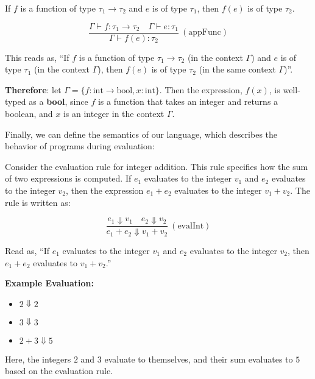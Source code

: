 \vspace{-1em}
\begin{Example}

    \label{ex:function_application}
    
    If $f$ is a function of type $\tau_1 \rightarrow \tau_2$ and $e$ is of type $\tau_1$, then $f(e)$ is of type $\tau_2$.
    \LARGE

    \[
    \frac{\Gamma \vdash f : \tau_1 \rightarrow \tau_2 \quad \Gamma \vdash e : \tau_1}{\Gamma \vdash f(e) : \tau_2} \ (\text{appFunc})
    \]

    \vspace{.5em}
    \normalsize
    \noindent
    This reads as, ``If $f$ is a function of type $\tau_1 \rightarrow \tau_2$ (in the context $\Gamma$) and $e$ is of type $\tau_1$ 
    (in the context $\Gamma$), then $f(e)$ is of type $\tau_2$ (in the same context $\Gamma$)''.

    \vspace{1em}
    \noindent
    \textbf{Therefore}: let $\Gamma = \{f : \text{int} \rightarrow \text{bool}, x : \text{int}\}$. Then the expression, $f(x)$, 
    is well-typed as a \textbf{bool}, since $f$ is a function that takes an integer and returns a boolean, and $x$ is an integer 
    in the context $\Gamma$.
\end{Example}

\newpage 

\noindent
Finally, we can define the semantics of our language, which describes the behavior of programs during evaluation:

\begin{Example}

    \label{ex:eval_integer_addition}
    Consider the evaluation rule for integer addition. This rule specifies how the sum of two expressions is computed. 
    If $e_1$ evaluates to the integer $v_1$ and $e_2$ evaluates to the integer $v_2$, 
    then the expression $e_1 + e_2$ evaluates to the integer $v_1 + v_2$. The rule is written as: \LARGE

    \[
    \frac{e_1 \Downarrow v_1 \quad e_2 \Downarrow v_2}{e_1 + e_2 \Downarrow v_1 + v_2} \ (\text{evalInt})
    \]

    \vspace{.5em}
    \normalsize
    \noindent
    Read as, ``If $e_1$ evaluates to the integer $v_1$ and $e_2$ evaluates to the integer $v_2$, 
    then $e_1 + e_2$ evaluates to $v_1 + v_2$.''

    \vspace{1em}
    \textbf{Example Evaluation:}
    \begin{itemize}
        \item $2 \Downarrow 2$
        \item $3 \Downarrow 3$
        \item $2 + 3 \Downarrow 5$
    \end{itemize}

    \noindent
    Here, the integers $2$ and $3$ evaluate to themselves, and their sum evaluates to $5$ based on the evaluation rule.
\end{Example}

